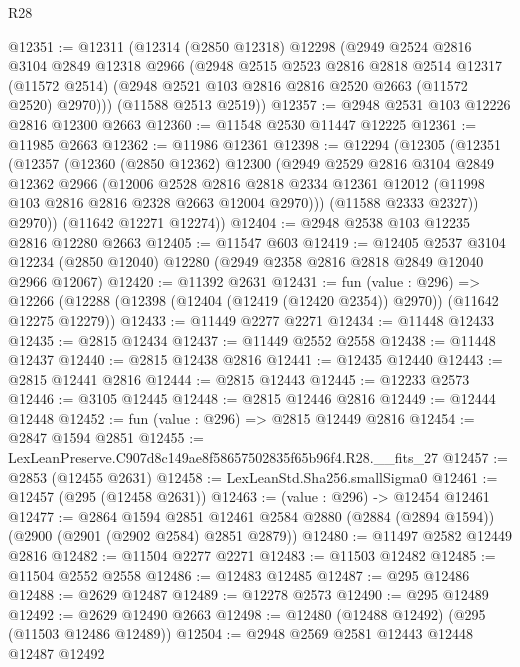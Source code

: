 \begin{lexlean}{R28}
\begin{coremodule}
@12351 := @12311
    (@12314
      (@2850 @12318)
      @12298
      (@2949
        @2524
        @2816
        @3104
        @2849
        @12318
        @2966
        (@2948
          @2515
          @2523
          @2816
          @2818
          @2514
          @12317
          (@11572 @2514)
          (@2948 @2521 @103 @2816 @2816 @2520 @2663 (@11572 @2520) @2970)))
      (@11588 @2513 @2519))
@12357 := @2948 @2531 @103 @12226 @2816 @12300 @2663
@12360 := @11548 @2530 @11447 @12225
@12361 := @11985 @2663
@12362 := @11986 @12361
@12398 := @12294
    (@12305
      (@12351
        (@12357
          (@12360
            (@2850 @12362)
            @12300
            (@2949
              @2529
              @2816
              @3104
              @2849
              @12362
              @2966
              (@12006
                @2528
                @2816
                @2818
                @2334
                @12361
                @12012
                (@11998 @103 @2816 @2816 @2328 @2663 @12004 @2970)))
            (@11588 @2333 @2327))
          @2970))
      (@11642 @12271 @12274))
@12404 := @2948 @2538 @103 @12235 @2816 @12280 @2663
@12405 := @11547 @603
@12419 := @12405
    @2537
    @3104
    @12234
    (@2850 @12040)
    @12280
    (@2949 @2358 @2816 @2818 @2849 @12040 @2966 @12067)
@12420 := @11392 @2631
@12431 := fun (value : @296) =>
  @12266 (@12288 (@12398 (@12404 (@12419 (@12420 @2354)) @2970)) (@11642 @12275 @12279))
@12433 := @11449 @2277 @2271
@12434 := @11448 @12433
@12435 := @2815 @12434
@12437 := @11449 @2552 @2558
@12438 := @11448 @12437
@12440 := @2815 @12438 @2816
@12441 := @12435 @12440
@12443 := @2815 @12441 @2816
@12444 := @2815 @12443
@12445 := @12233 @2573
@12446 := @3105 @12445
@12448 := @2815 @12446 @2816
@12449 := @12444 @12448
@12452 := fun (value : @296) => @2815 @12449 @2816
@12454 := @2847 @1594 @2851
@12455 := LexLeanPreserve.C907d8c149ae8f58657502835f65b96f4.R28.__fits_27
@12457 := @2853 (@12455 @2631)
@12458 := LexLeanStd.Sha256.smallSigma0
@12461 := @12457 (@295 (@12458 @2631))
@12463 := (value : @296) -> @12454 @12461
@12477 := @2864
    @1594
    @2851
    @12461
    @2584
    @2880
    (@2884 (@2894 @1594))
    (@2900 (@2901 (@2902 @2584) @2851 @2879))
@12480 := @11497 @2582 @12449 @2816
@12482 := @11504 @2277 @2271
@12483 := @11503 @12482
@12485 := @11504 @2552 @2558
@12486 := @12483 @12485
@12487 := @295 @12486
@12488 := @2629 @12487
@12489 := @12278 @2573
@12490 := @295 @12489
@12492 := @2629 @12490 @2663
@12498 := @12480 (@12488 @12492) (@295 (@11503 @12486 @12489))
@12504 := @2948 @2569 @2581 @12443 @12448 @12487 @12492

\end{coremodule}
\end{lexlean}
